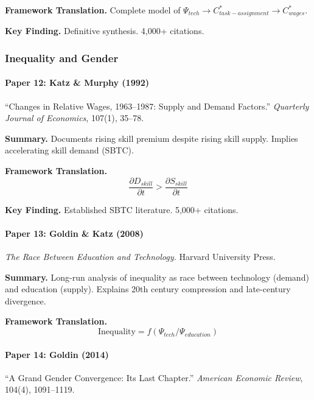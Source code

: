 \textbf{Framework Translation.}
Complete model of $\Psi_{tech} \to C^*_{task-assignment} \to C^*_{wages}$.

\textbf{Key Finding.}
Definitive synthesis. 4,000+ citations.

\subsubsection{Inequality and Gender}

\paragraph{Paper 12: Katz \& Murphy (1992)}

``Changes in Relative Wages, 1963--1987: Supply and Demand Factors.''
\textit{Quarterly Journal of Economics}, 107(1), 35--78.

\textbf{Summary.}
Documents rising skill premium despite rising skill supply. Implies 
accelerating skill demand (SBTC).

\textbf{Framework Translation.}
\begin{equation}
\frac{\partial D_{skill}}{\partial t} > \frac{\partial S_{skill}}{\partial t}
\end{equation}

\textbf{Key Finding.}
Established SBTC literature. 5,000+ citations.

\paragraph{Paper 13: Goldin \& Katz (2008)}

\textit{The Race Between Education and Technology.}
Harvard University Press.

\textbf{Summary.}
Long-run analysis of inequality as race between technology (demand) and 
education (supply). Explains 20th century compression and late-century divergence.

\textbf{Framework Translation.}
\begin{equation}
\text{Inequality} = f(\Psi_{tech}/\Psi_{education})
\end{equation}

\paragraph{Paper 14: Goldin (2014)}

``A Grand Gender Convergence: Its Last Chapter.''
\textit{American Economic Review}, 104(4), 1091--1119.

